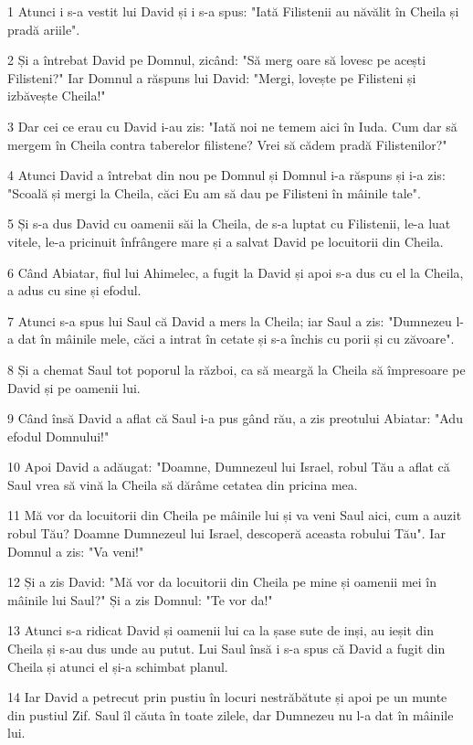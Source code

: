 \par 1 Atunci i s-a vestit lui David și i s-a spus: "Iată Filistenii au năvălit în Cheila și pradă ariile".
\par 2 Și a întrebat David pe Domnul, zicând: "Să merg oare să lovesc pe acești Filisteni?" Iar Domnul a răspuns lui David: "Mergi, lovește pe Filisteni și izbăvește Cheila!"
\par 3 Dar cei ce erau cu David i-au zis: "Iată noi ne temem aici în Iuda. Cum dar să mergem în Cheila contra taberelor filistene? Vrei să cădem pradă Filistenilor?"
\par 4 Atunci David a întrebat din nou pe Domnul și Domnul i-a răspuns și i-a zis: "Scoală și mergi la Cheila, căci Eu am să dau pe Filisteni în mâinile tale".
\par 5 Și s-a dus David cu oamenii săi la Cheila, de s-a luptat cu Filistenii, le-a luat vitele, le-a pricinuit înfrângere mare și a salvat David pe locuitorii din Cheila.
\par 6 Când Abiatar, fiul lui Ahimelec, a fugit la David și apoi s-a dus cu el la Cheila, a adus cu sine și efodul.
\par 7 Atunci s-a spus lui Saul că David a mers la Cheila; iar Saul a zis: "Dumnezeu l-a dat în mâinile mele, căci a intrat în cetate și s-a închis cu porii și cu zăvoare".
\par 8 Și a chemat Saul tot poporul la război, ca să meargă la Cheila să împresoare pe David și pe oamenii lui.
\par 9 Când însă David a aflat că Saul i-a pus gând rău, a zis preotului Abiatar: "Adu efodul Domnului!"
\par 10 Apoi David a adăugat: "Doamne, Dumnezeul lui Israel, robul Tău a aflat că Saul vrea să vină la Cheila să dărâme cetatea din pricina mea.
\par 11 Mă vor da locuitorii din Cheila pe mâinile lui și va veni Saul aici, cum a auzit robul Tău? Doamne Dumnezeul lui Israel, descoperă aceasta robului Tău". Iar Domnul a zis: "Va veni!"
\par 12 Și a zis David: "Mă vor da locuitorii din Cheila pe mine și oamenii mei în mâinile lui Saul?" Și a zis Domnul: "Te vor da!"
\par 13 Atunci s-a ridicat David și oamenii lui ca la șase sute de inși, au ieșit din Cheila și s-au dus unde au putut. Lui Saul însă i s-a spus că David a fugit din Cheila și atunci el și-a schimbat planul.
\par 14 Iar David a petrecut prin pustiu în locuri nestrăbătute și apoi pe un munte din pustiul Zif. Saul îl căuta în toate zilele, dar Dumnezeu nu l-a dat în mâinile lui.
